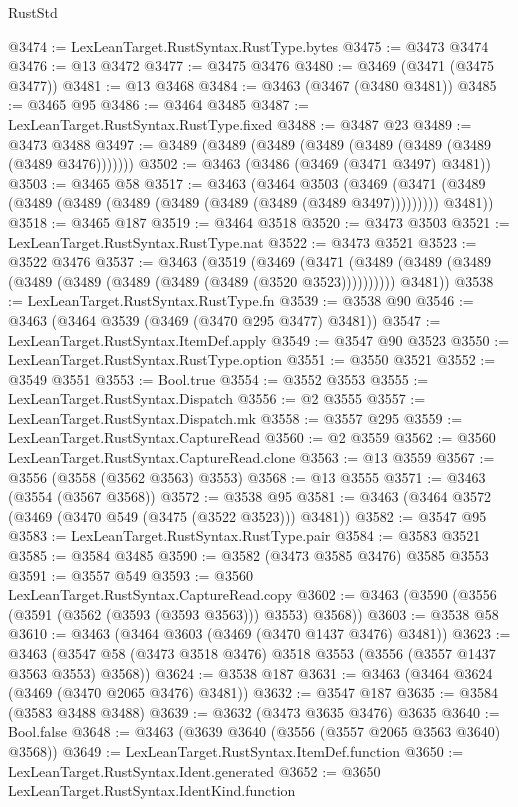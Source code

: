\begin{lexlean}{RustStd}
\begin{coremodule}
@3474 := LexLeanTarget.RustSyntax.RustType.bytes
@3475 := @3473 @3474
@3476 := @13 @3472
@3477 := @3475 @3476
@3480 := @3469 (@3471 (@3475 @3477))
@3481 := @13 @3468
@3484 := @3463 (@3467 (@3480 @3481))
@3485 := @3465 @95
@3486 := @3464 @3485
@3487 := LexLeanTarget.RustSyntax.RustType.fixed
@3488 := @3487 @23
@3489 := @3473 @3488
@3497 := @3489 (@3489 (@3489 (@3489 (@3489 (@3489 (@3489 (@3489 @3476)))))))
@3502 := @3463 (@3486 (@3469 (@3471 @3497) @3481))
@3503 := @3465 @58
@3517 := @3463
    (@3464
      @3503
      (@3469 (@3471 (@3489 (@3489 (@3489 (@3489 (@3489 (@3489 (@3489 (@3489 @3497))))))))) @3481))
@3518 := @3465 @187
@3519 := @3464 @3518
@3520 := @3473 @3503
@3521 := LexLeanTarget.RustSyntax.RustType.nat
@3522 := @3473 @3521
@3523 := @3522 @3476
@3537 := @3463
    (@3519
      (@3469
        (@3471 (@3489 (@3489 (@3489 (@3489 (@3489 (@3489 (@3489 (@3489 (@3520 @3523))))))))))
        @3481))
@3538 := LexLeanTarget.RustSyntax.RustType.fn
@3539 := @3538 @90
@3546 := @3463 (@3464 @3539 (@3469 (@3470 @295 @3477) @3481))
@3547 := LexLeanTarget.RustSyntax.ItemDef.apply
@3549 := @3547 @90 @3523
@3550 := LexLeanTarget.RustSyntax.RustType.option
@3551 := @3550 @3521
@3552 := @3549 @3551
@3553 := Bool.true
@3554 := @3552 @3553
@3555 := LexLeanTarget.RustSyntax.Dispatch
@3556 := @2 @3555
@3557 := LexLeanTarget.RustSyntax.Dispatch.mk
@3558 := @3557 @295
@3559 := LexLeanTarget.RustSyntax.CaptureRead
@3560 := @2 @3559
@3562 := @3560 LexLeanTarget.RustSyntax.CaptureRead.clone
@3563 := @13 @3559
@3567 := @3556 (@3558 (@3562 @3563) @3553)
@3568 := @13 @3555
@3571 := @3463 (@3554 (@3567 @3568))
@3572 := @3538 @95
@3581 := @3463 (@3464 @3572 (@3469 (@3470 @549 (@3475 (@3522 @3523))) @3481))
@3582 := @3547 @95
@3583 := LexLeanTarget.RustSyntax.RustType.pair
@3584 := @3583 @3521
@3585 := @3584 @3485
@3590 := @3582 (@3473 @3585 @3476) @3585 @3553
@3591 := @3557 @549
@3593 := @3560 LexLeanTarget.RustSyntax.CaptureRead.copy
@3602 := @3463 (@3590 (@3556 (@3591 (@3562 (@3593 (@3593 @3563))) @3553) @3568))
@3603 := @3538 @58
@3610 := @3463 (@3464 @3603 (@3469 (@3470 @1437 @3476) @3481))
@3623 := @3463 (@3547 @58 (@3473 @3518 @3476) @3518 @3553 (@3556 (@3557 @1437 @3563 @3553) @3568))
@3624 := @3538 @187
@3631 := @3463 (@3464 @3624 (@3469 (@3470 @2065 @3476) @3481))
@3632 := @3547 @187
@3635 := @3584 (@3583 @3488 @3488)
@3639 := @3632 (@3473 @3635 @3476) @3635
@3640 := Bool.false
@3648 := @3463 (@3639 @3640 (@3556 (@3557 @2065 @3563 @3640) @3568))
@3649 := LexLeanTarget.RustSyntax.ItemDef.function
@3650 := LexLeanTarget.RustSyntax.Ident.generated
@3652 := @3650 LexLeanTarget.RustSyntax.IdentKind.function

\end{coremodule}
\end{lexlean}

